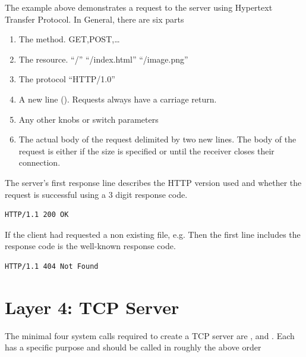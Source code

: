 The example above demonstrates a request to the server using Hypertext Transfer Protocol.
In General, there are six parts

\begin{enumerate}
\item The method. GET,POST,\ldots{}
\item The resource. ``/'' ``/index.html'' ``/image.png''
\item The protocol ``HTTP/1.0''
\item A new line (\keyword{\\r\\n}). Requests always have a carriage return.
\item Any other knobs or switch parameters
\item The actual body of the request delimited by two new lines. The body of the request is either if the size is specified or until the receiver closes their connection.
\end{enumerate}

The server's first response line describes the HTTP version used and whether the request is successful using a 3 digit response code.

\begin{lstlisting}
HTTP/1.1 200 OK
\end{lstlisting}

If the client had requested a non existing file, e.g.
 Then the first line includes the response code is the well-known  response code.

\begin{lstlisting}
HTTP/1.1 404 Not Found
\end{lstlisting}


\section{Layer 4: TCP Server}

The minimal four system calls required to create a TCP server are ,   and .
Each has a specific purpose and should be called in roughly the above order

